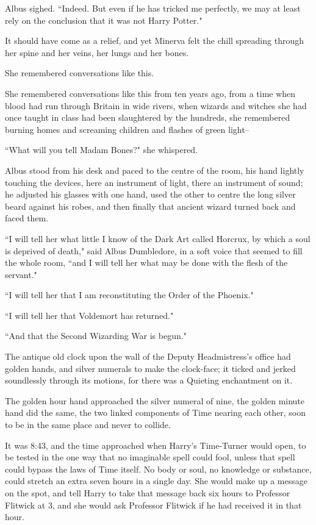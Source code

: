 Albus sighed. ``Indeed. But even if he has tricked me perfectly, we may at least rely on the conclusion that it was not Harry Potter."

It should have come as a relief, and yet Minerva felt the chill spreading through her spine and her veins, her lungs and her bones.

She remembered conversations like this.

She remembered conversations like this from ten years ago, from a time when blood had run through Britain in wide rivers, when wizards and witches she had once taught in class had been slaughtered by the hundreds, she remembered burning homes and screaming children and flashes of green light\---

``What will you tell Madam Bones?" she whispered.

Albus stood from his desk and paced to the centre of the room, his hand lightly touching the devices, here an instrument of light, there an instrument of sound; he adjusted his glasses with one hand, used the other to centre the long silver beard against his robes, and then finally that ancient wizard turned back and faced them.

``I will tell her what little I know of the Dark Art called Horcrux, by which a soul is deprived of death," said Albus Dumbledore, in a soft voice that seemed to fill the whole room, ``and I will tell her what may be done with the flesh of the servant."

``I will tell her that I am reconstituting the Order of the Phoenix."

``I will tell her that Voldemort has returned."

``And that the Second Wizarding War is begun."


The antique old clock upon the wall of the Deputy Headmistress's office had golden hands, and silver numerals to make the clock-face; it ticked and jerked soundlessly through its motions, for there was a Quieting enchantment on it.

The golden hour hand approached the silver numeral of nine, the golden minute hand did the same, the two linked components of Time nearing each other, soon to be in the same place and never to collide.

It was 8:43\pm, and the time approached when Harry's Time-Turner would open, to be tested in the one way that no imaginable spell could fool, unless that spell could bypass the laws of Time itself. No body or soul, no knowledge or substance, could stretch an extra seven hours in a single day. She would make up a message on the spot, and tell Harry to take that message back six hours to Professor Flitwick at 3\pm, and she would ask Professor Flitwick if he had received it in that hour.

